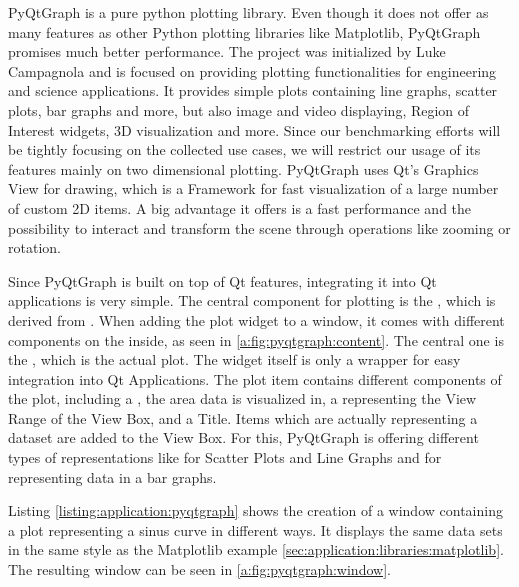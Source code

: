 PyQtGraph is a pure python plotting library. Even though it does not offer as
many features as other Python plotting libraries like Matplotlib, PyQtGraph
promises much better performance. The project was initialized by Luke Campagnola
and is focused on providing plotting functionalities for engineering and science
applications. It provides simple plots containing line graphs, scatter plots,
bar graphs and more, but also image and video displaying, Region of Interest
widgets, 3D visualization and more.  Since our benchmarking efforts will be
tightly focusing on the collected use cases, we will restrict our usage of its
features mainly on two dimensional plotting. PyQtGraph uses Qt's Graphics View
for drawing, which is a Framework for fast visualization of a large number of
custom 2D items. A big advantage it offers is a fast performance and the
possibility to interact and transform the scene through operations like
zooming or rotation.
\cite{GraphicsView}

Since PyQtGraph is built on top of Qt features, integrating it into Qt
applications is very simple. The central component for plotting is the
, which is derived from
. When adding the plot widget to a
window, it comes with different components on the inside, as seen in
\ref{a:fig:pyqtgraph:content}. The central one is the
, which is the actual plot. The widget
itself is only a wrapper for easy integration into Qt Applications. The plot
item contains different components of the plot, including a
, the area data is visualized in,
a  representing the View Range
of the View Box, and a Title. Items which are actually representing a dataset are
added to the View Box. For this, PyQtGraph is offering different types of
representations like  for Scatter
Plots and Line Graphs and  for
representing data in a bar graphs.

Listing \ref{listing:application:pyqtgraph} shows the creation of a window
containing a plot representing a sinus curve in different ways. It displays the
same data sets in the same style as the Matplotlib example
\ref{sec:application:libraries:matplotlib}. The resulting window can be seen in
\ref{a:fig:pyqtgraph:window}.
\cite{PyQtGraphDoc}




